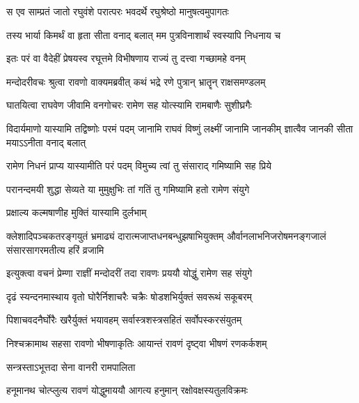 \twolineshloka
{स एव साम्प्रतं जातो रघुवंशे परात्परः}
{भवदर्थे रघुश्रेष्ठो मानुषत्वमुपागतः} %

\twolineshloka
{तस्य भार्या किमर्थं वा हृता सीता वनाद् बलात्}
{मम पुत्रविनाशार्थं स्वस्यापि निधनाय च} %

\twolineshloka
{इतः परं वा वैदेहीं प्रेषयस्व रघूत्तमे}
{विभीषणाय राज्यं तु दत्त्वा गच्छामहे वनम्} %

\twolineshloka
{मन्दोदरीवचः श्रुत्वा रावणो वाक्यमब्रवीत्}
{कथं भद्रे रणे पुत्रान् भ्रातॄन् राक्षसमण्डलम्} %

\twolineshloka
{घातयित्वा राघवेण जीवामि वनगोचरः}
{रामेण सह योत्स्यामि रामबाणैः सुशीघ्रगैः} %

\threelineshloka
{विदार्यमाणो यास्यामि तद्विष्णोः परमं पदम्}
{जानामि राघवं विष्णुं लक्ष्मीं जानामि जानकीम्}
{ज्ञात्वैव जानकी सीता मयाऽऽनीता वनाद् बलात्} %

\twolineshloka
{रामेण निधनं प्राप्य यास्यामीति परं पदम्}
{विमुच्य त्वां तु संसाराद् गमिष्यामि सह प्रिये} %

\twolineshloka
{परानन्दमयी शुद्धा सेव्यते या मुमुक्षुभिः}
{तां गतिं तु गमिष्यामि हतो रामेण संयुगे} %

\onelineshloka
{प्रक्षाल्य कल्मषाणीह मुक्तिं यास्यामि दुर्लभाम्} %

\fourlineindentedshloka
{क्लेशादिपञ्चकतरङ्गयुतं भ्रमाढ्यं}
{दारात्मजाप्तधनबन्धुझषाभियुक्तम्}
{और्वानलाभनिजरोषमनङ्गजालं}
{संसारसागरमतीत्य हरिं व्रजामि} %






\twolineshloka
{इत्युक्त्वा वचनं प्रेम्णा राज्ञीं मन्दोदरीं तदा}
{रावणः प्रययौ योद्धुं रामेण सह संयुगे} %

\twolineshloka
{दृढं स्यन्दनमास्थाय वृतो घोरैर्निशाचरैः}
{चक्रैः षोडशभिर्युक्तं सवरूथं सकूबरम्} %

\twolineshloka
{पिशाचवदनैर्घोरैः खरैर्युक्तं भयावहम्}
{सर्वास्त्रशस्त्रसहितं सर्वोपस्करसंयुतम्} %

\twolineshloka
{निश्चक्रामाथ सहसा रावणो भीषणाकृतिः}
{आयान्तं रावणं दृष्ट्वा भीषणं रणकर्कशम्} %

{सन्त्रस्ताऽभूत्तदा सेना वानरी रामपालिता} %


\twolineshloka
{हनूमानथ चोत्प्लुत्य रावणं योद्धुमाययौ}
{आगत्य हनुमान् रक्षोवक्षस्यतुलविक्रमः} %

